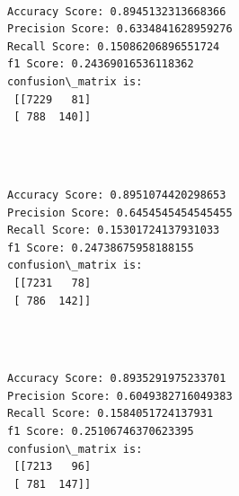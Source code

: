 \documentclass[11pt]{article}
\begin{document}
    \begin{center}
    \end{center}
    { \hspace*{\fill} \\}
    


    \begin{Verbatim}[commandchars=\\\{\}]
Accuracy Score: 0.8945132313668366
Precision Score: 0.6334841628959276
Recall Score: 0.15086206896551724
f1 Score: 0.24369016536118362
confusion\_matrix is: 
 [[7229   81]
 [ 788  140]] 


    \end{Verbatim}

    \begin{center}
    \end{center}
    { \hspace*{\fill} \\}
    
 

    \begin{Verbatim}[commandchars=\\\{\}]
Accuracy Score: 0.8951074420298653
Precision Score: 0.6454545454545455
Recall Score: 0.15301724137931033
f1 Score: 0.24738675958188155
confusion\_matrix is: 
 [[7231   78]
 [ 786  142]] 


    \end{Verbatim}

    \begin{center}
    \end{center}
    { \hspace*{\fill} \\}
    
 

    \begin{Verbatim}[commandchars=\\\{\}]
Accuracy Score: 0.8935291975233701
Precision Score: 0.6049382716049383
Recall Score: 0.1584051724137931
f1 Score: 0.25106746370623395
confusion\_matrix is: 
 [[7213   96]
 [ 781  147]] 


    \end{Verbatim}

    \begin{center}
    \end{center}
    { \hspace*{\fill} \\}
    
\end{document}
